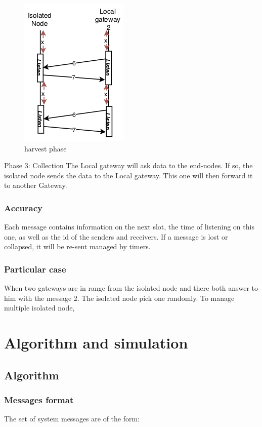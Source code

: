 \documentclass[conference]{IEEEtran}
\begin{document}
\begin{figure}[htbp]
\centerline{\includegraphics{harvest.png}}
\caption{harvest phase}
\label{fig3}
\end{figure}
Phase 3: Collection
The Local gateway will ask data to the end-nodes. If so, the isolated node sends the data to the Local gateway. This one will then forward it to another Gateway.
\subsubsection{Accuracy}
Each message contains information on the next slot, the time of listening on this one, as well as the id of the senders and receivers. If a message is lost or collapsed, it will be re-sent managed by timers.

\subsubsection{Particular case}
When two gateways are in range from the isolated node and there both answer to him with the message 2. The isolated node pick one randomly.
To manage multiple isolated node, 
\section{Algorithm and simulation}
\subsection{Algorithm}

\subsubsection{Messages format}

The set of system messages are of the form:
\end{document}

